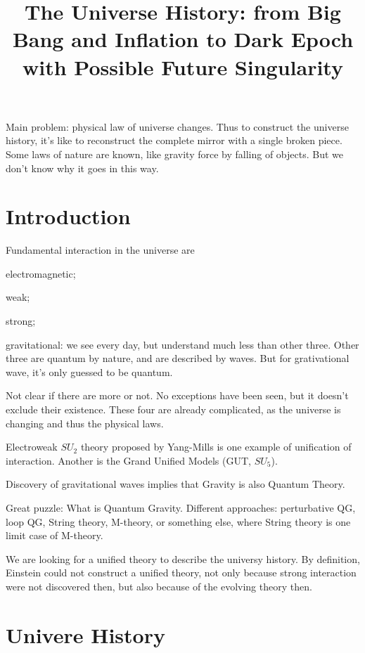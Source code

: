 \documentclass{ctexart}
\title{The Universe History: from Big Bang and Inflation to Dark Epoch with Possible Future Singularity}
\date{}
\begin{document}
\maketitle
Main problem: physical law of universe changes. Thus to construct the universe history, it's like to reconstruct the complete mirror with a single broken piece. Some laws of nature are known, like gravity force by falling of objects. But we don't know why it goes in this way.
\par
\section{Introduction} %
\label{sec:introduction}

Fundamental interaction in the universe are
\begin{cenum}
    \item electromagnetic;
    \item weak;
    \item strong;
    \item gravitational: we see every day, but understand much less than other three. Other three are quantum by nature, and are described by waves. But for grativational wave, it's only guessed to be quantum.
\end{cenum}
Not clear if there are more or not. No exceptions have been seen, but it doesn't exclude their existence. These four are already complicated, as the universe is changing and thus the physical laws.
\par
Electroweak $SU_2$ theory proposed by Yang-Mills is one example of unification of interaction. Another is the Grand Unified Models (GUT, $SU_5$).
\par
Discovery of gravitational waves implies that Gravity is also Quantum Theory.
\par
Great puzzle: What is Quantum Gravity. Different approaches: perturbative QG, loop QG, String theory, M-theory, or something else, where String theory is one limit case of M-theory. 
\par
We are looking for a unified theory to describe the universy history. By definition, Einstein could not construct a unified theory, not only because strong interaction were not discovered then, but also because of the evolving theory then.


\section{Univere History} %
\label{sec:univere_history}
\end{document}
